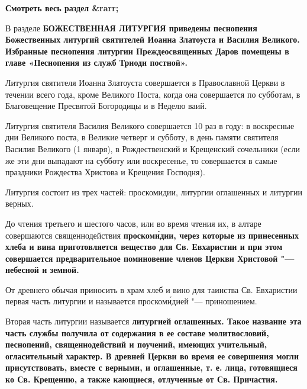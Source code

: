 




\bfseries Смотреть весь раздел &rarr;\normalfont{} 




В разделе \bfseries БОЖЕСТВЕННАЯ ЛИТУРГИЯ\normalfont{} приведены песнопения Божественных литургий святителей Иоанна Златоуста и Василия Великого. Избранные песнопения литургии Преждеосвященных Даров помещены в главе «Песнопения из служб Триоди постной».


Литургия святителя Иоанна Златоуста совершается в Православной Церкви в течении всего года, кроме Великого Поста, когда она совершается по субботам, в Благовещение Пресвятой Богородицы и в Неделю ваий.


Литургия святителя Василия Великого совершается 10 раз в году: в воскресные дни Великого поста, в Великие четверг и субботу, в день памяти святителя Василия Великого (1 января), в Рождественский и Крещенский сочельники (если же эти дни выпадают на субботу или воскресенье, то совершается в самые праздники Рождества Христова и Крещения Господня).


Литургия состоит из трех частей: проскомидии, литургии оглашенных и литургии верных.


\mychapterending




До чтения третьего и шестого часов, или во время чтения их, в алтаре совершаются священнодействия \bfseries проскоми́дии\normalfont{}, через которые из принесенных хлеба и вина приготовляется вещество для Св. Евхаристии и при этом совершается предварительное поминовение членов Церкви Христовой "--- небесной и земной.


От древнего обычая приносить в храм хлеб и вино для таинства Св. Евхаристии первая часть литургии и называется проскоми́дией "--- приношением.


\mychapterending




Вторая часть литургии называется \bfseries литургией оглашенных\normalfont{}. Такое название эта часть службы получила от содержания в ее составе молитвословий, песнопений, священнодействий и поучений, имеющих учительный, огласительный характер. В древней Церкви во время ее совершения могли присутствовать, вместе с верными, и оглашенные, т. е. лица, готовящиеся ко Св. Крещению, а также кающиеся, отлученные от Св. Причастия.


